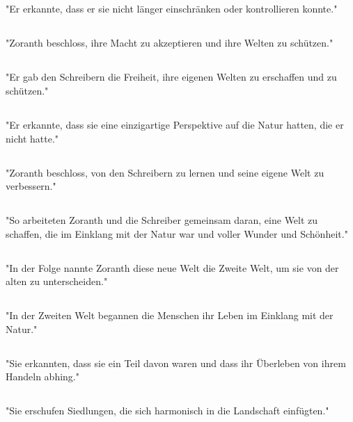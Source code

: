 \documentclass{article}
\begin{document}
\subsection{}
"Er erkannte, dass er sie nicht länger einschränken oder kontrollieren konnte."
\subsection{}
"Zoranth beschloss, ihre Macht zu akzeptieren und ihre Welten zu schützen."
\subsection{}
"Er gab den Schreibern die Freiheit, ihre eigenen Welten zu erschaffen und zu schützen."
\subsection{}
"Er erkannte, dass sie eine einzigartige Perspektive auf die Natur hatten, die er nicht hatte."
\subsection{}
"Zoranth beschloss, von den Schreibern zu lernen und seine eigene Welt zu verbessern."
\subsection{}
"So arbeiteten Zoranth und die Schreiber gemeinsam daran, eine Welt zu schaffen, die im Einklang mit der Natur war und voller Wunder und Schönheit."
\subsection{}
"In der Folge nannte Zoranth diese neue Welt die Zweite Welt, um sie von der alten zu unterscheiden."
\subsection{}
"In der Zweiten Welt begannen die Menschen ihr Leben im Einklang mit der Natur."
\subsection{}
"Sie erkannten, dass sie ein Teil davon waren und dass ihr Überleben von ihrem Handeln abhing."
\subsection{}
"Sie erschufen Siedlungen, die sich harmonisch in die Landschaft einfügten."
\end{document}
